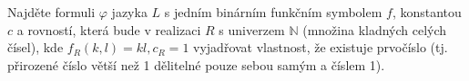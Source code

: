 Najděte formuli $\varphi$ jazyka $L$ s jedním binárním funkčním symbolem $f$,
konstantou $c$ a rovností, která bude v realizaci $R$ s univerzem $\mathbb{N}$
(množina kladných celých čísel), kde $f_{R}(k,l)=kl, c_{R}=1$ vyjadřovat
vlastnost, že existuje prvočíslo (tj. přirozené číslo větší než 1 dělitelné
pouze sebou samým a číslem 1).
